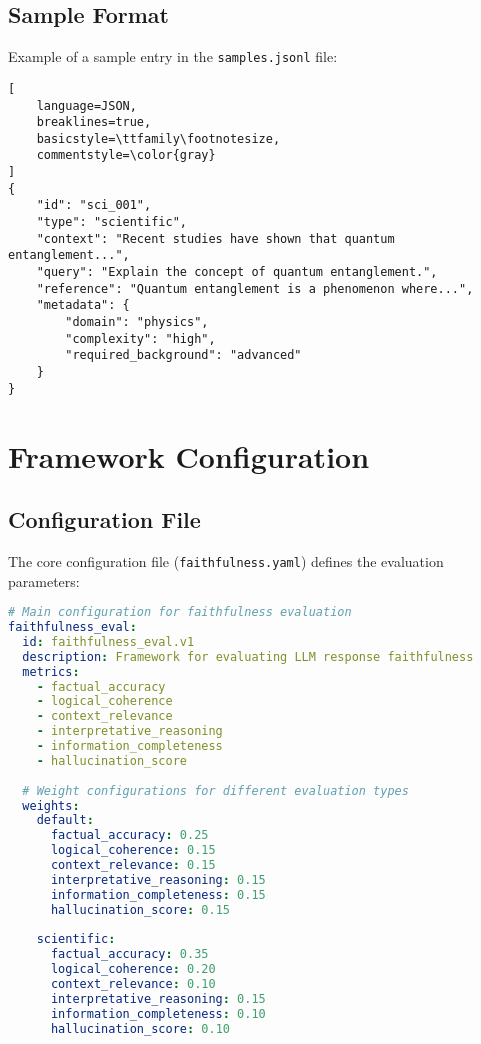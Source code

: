 \vspace{0.5em}
\subsection{Sample Format}
Example of a sample entry in the \texttt{samples.jsonl} file:

\begin{lstlisting}[
    language=JSON,
    breaklines=true,
    basicstyle=\ttfamily\footnotesize,
    commentstyle=\color{gray}
]
{
    "id": "sci_001",
    "type": "scientific",
    "context": "Recent studies have shown that quantum entanglement...",
    "query": "Explain the concept of quantum entanglement.",
    "reference": "Quantum entanglement is a phenomenon where...",
    "metadata": {
        "domain": "physics",
        "complexity": "high",
        "required_background": "advanced"
    }
}
\end{lstlisting}

\section{Framework Configuration}

\subsection{Configuration File}
The core configuration file (\texttt{faithfulness.yaml}) defines the evaluation parameters:

\begin{lstlisting}[language=YAML, breaklines=true, basicstyle=\ttfamily\scriptsize, commentstyle=\color{gray}]
# Main configuration for faithfulness evaluation
faithfulness_eval:
  id: faithfulness_eval.v1
  description: Framework for evaluating LLM response faithfulness
  metrics:
    - factual_accuracy
    - logical_coherence
    - context_relevance
    - interpretative_reasoning
    - information_completeness
    - hallucination_score
  
  # Weight configurations for different evaluation types
  weights:
    default:
      factual_accuracy: 0.25
      logical_coherence: 0.15
      context_relevance: 0.15
      interpretative_reasoning: 0.15
      information_completeness: 0.15
      hallucination_score: 0.15
    
    scientific:
      factual_accuracy: 0.35
      logical_coherence: 0.20
      context_relevance: 0.10
      interpretative_reasoning: 0.15
      information_completeness: 0.10
      hallucination_score: 0.10
\end{lstlisting}

